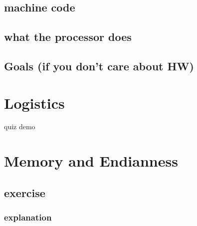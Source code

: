 \subsection{machine code}



\subsection{what the processor does}




\subsection{Goals (if you don't care about HW)}


\section{Logistics}


\begin{frame}{quiz demo}
\end{frame}

\section{Memory and Endianness}



\subsection{exercise}

\subsubsection{explanation}



